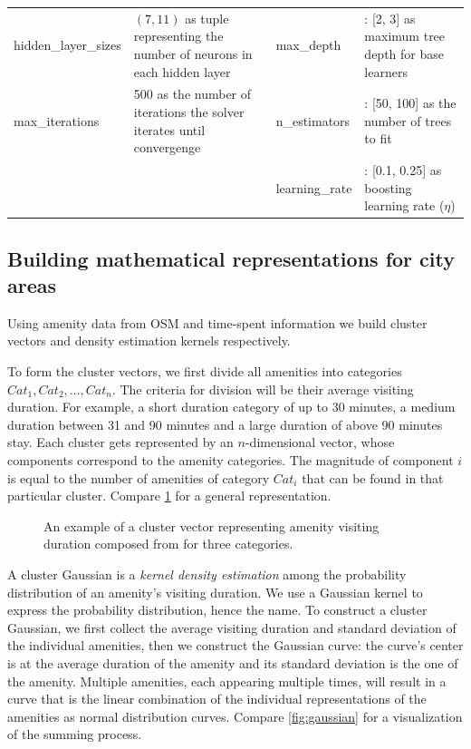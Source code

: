 \documentclass{ws-ijait}
\begin{document}
\begin{table}
{\begin{tabular}{lp{4cm}lp{4cm}}
					hidden\_layer\_sizes & $(7, 11)$ as tuple representing the number of neurons in each hidden layer & max\_depth & : [2, 3] as maximum tree depth for base learners \\
					
					max\_iterations & 500 as the number of iterations the solver iterates until convergenge & n\_estimators & : [50, 100] as the number of trees to fit\\
					
					& & learning\_rate & : [0.1, 0.25] as boosting learning rate ($\eta$)
					
					\botrule
			\end{tabular}}
			\label{tab:ml_params}
		\end{table}
		
		\subsection{Building mathematical representations for city areas}
		Using amenity data from OSM and time-spent information we build cluster vectors and density estimation kernels respectively.
		
		To form the cluster vectors, we first divide all amenities into categories $Cat_1, Cat_2, ..., Cat_n$. The criteria for division will be their average visiting duration. For example, a short duration category of up to 30 minutes, a medium duration between 31 and 90 minutes and a large duration of above 90 minutes stay. Each cluster gets represented by an $n$-dimensional vector, whose components correspond to the amenity categories. The magnitude of component $i$ is equal to the number of amenities of category $Cat_i$ that can be found in that particular cluster. Compare \cref{fig:cluster_vector} for a general representation.
		
		\begin{figure}[!ht]
			\centering
			
			\caption{An example of a cluster vector representing amenity visiting duration composed from for three categories.}
			\label{fig:cluster_vector}
		\end{figure}
		
		A cluster Gaussian is a \textit{kernel density estimation} among the probability distribution of an amenity's visiting duration. We use a Gaussian kernel to express the probability distribution, hence the name. To construct a cluster Gaussian, we first collect the average visiting duration and standard deviation of the individual amenities, then we construct the Gaussian curve: the curve's center is at the average duration of the amenity and its standard deviation is the one of the amenity. Multiple amenities, each appearing multiple times, will result in a curve that is the linear combination of the individual representations of the amenities as normal distribution curves. Compare \cref{fig:gaussian} for a visualization of the summing process.
		
\end{document}
